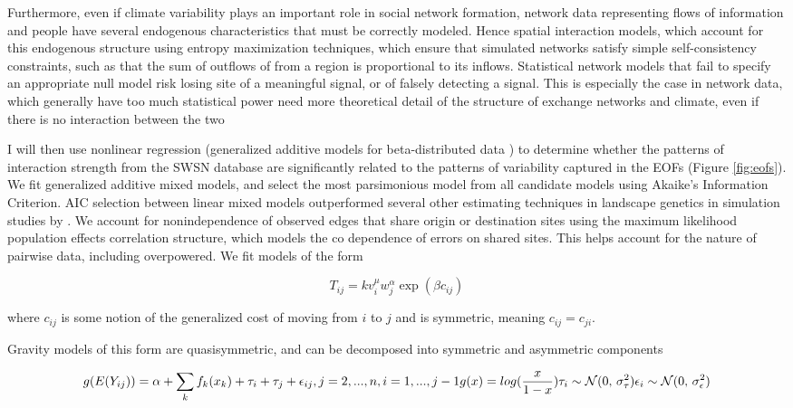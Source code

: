 \documentclass[fleqn,10pt]{wlscirep}
\begin{document}
Furthermore, even if climate variability plays an important role in social network formation, network data representing flows of information and people have several endogenous characteristics that must be correctly modeled. 
Hence spatial interaction models, which account for this endogenous structure using entropy maximization techniques, which ensure that simulated networks satisfy simple self-consistency constraints, such as that the sum of outflows of from a region is proportional to its inflows.
Statistical network models that fail to specify an appropriate null model risk losing site of a meaningful signal, or of falsely detecting a signal.
This is especially the case in network data, which generally have too much statistical power need more theoretical detail of the structure of exchange networks and climate, even if there is no interaction between the two 

I will then use nonlinear regression (generalized additive models for beta-distributed data \cite{Wood2006a}) to determine whether the patterns of interaction strength from the SWSN database are significantly related to the patterns of variability captured in the EOFs (Figure \ref{fig:eofs}).
We fit generalized additive mixed models, and select the most parsimonious model from all candidate models using Akaike's Information Criterion. AIC selection between linear mixed models outperformed several other estimating techniques in landscape genetics in simulation studies by \cite{Shirk et al 2018}. We account for nonindependence of observed edges that share origin or destination sites using the maximum likelihood population effects correlation structure, which models the co dependence of errors on shared sites. This helps account for the nature of pairwise data, including overpowered.
We fit models of the form

$$T_{ij} = k v_i^\mu w_j^\alpha \exp(\beta c_{ij})$$

where $c_{ij}$ is some notion of the generalized cost of moving from $i$ to $j$ and is symmetric, meaning $c_{ij} = c_{ji}$.

Gravity models of this form are quasisymmetric, and can be decomposed into symmetric and asymmetric components

\begin{equation}
    g(E(Y_{ij})) = \alpha + \sum_k f_k(x_k) + \tau_i + \tau_j + \epsilon_{ij}, j = 2, ..., n, i = 1, ..., j - 1\\
    g(x) = log(\frac{x}{1-x})\\
    \tau_i \sim \mathcal{N}(0,\,\sigma^{2}_{\tau})\\
    \epsilon_i \sim \mathcal{N}(0,\,\sigma^{2}_{\epsilon})
\end{equation}
\end{document}
